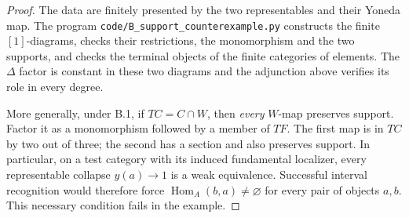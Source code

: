 \begin{proof}
The data are finitely presented by the two representables
and their Yoneda map.  The program
\texttt{code/B\_support\_counterexample.py} constructs the finite
$[1]$-diagrams, checks their restrictions, the monomorphism and the two
supports, and checks the terminal objects of the finite categories of
elements.  The $\Delta$ factor is constant in these two diagrams and the
adjunction above verifies its role in every degree.

More generally, under B.1, if $TC=C\cap W$, then \emph{every} $W$-map
preserves support.  Factor it as a monomorphism followed by a member of
$TF$.  The first map is in $TC$ by two out of three; the second has a
section and also preserves support.  In particular, on a test category
with its induced fundamental localizer, every representable collapse
$y(a)\to1$ is a weak equivalence.  Successful interval recognition would
therefore force $\operatorname{Hom}_A(b,a)\ne\varnothing$ for every
pair of objects $a,b$.  This necessary condition fails in the example.
\end{proof}

